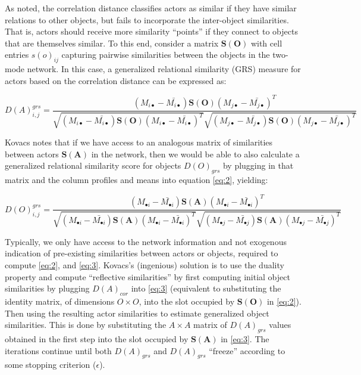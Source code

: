 \documentclass[a4paper,fleqn]{cas-sc}
\begin{document}
As noted, the correlation distance classifies actors as similar if they have similar relations to other objects, but fails to incorporate the inter-object similarities. That is, actors should receive more similarity ``points'' if they connect to objects that are themselves similar. To this end, consider a matrix $\mathbf{S(O)}$ with cell entries $s(o)_{ij}$ capturing pairwise similarities between the objects in the two-mode network. In this case, a generalized relational similarity (GRS) measure for actors based on the correlation distance can be expressed as:

\begin{equation}
    D(A)^{grs}_{i,j} = 
    \frac{
    (M_{i\bullet} - \bar{M_{i\bullet}})
    \mathbf{S(O)}
    (M_{j\bullet} - \bar{M_{j\bullet}})^T
    }
    {
    \sqrt{
    (M_{i\bullet} - \bar{M_{i\bullet}})
    \mathbf{S(O)}
    (M_{i\bullet} - \bar{M_{i\bullet}})^T
    }
    \sqrt{
    (M_{j\bullet} - \bar{M_{j\bullet}})
    \mathbf{S(O)}
    (M_{j\bullet} - \bar{M_{j\bullet}})^T
        }
    }
    \label{eq:2}
\end{equation}

Kovacs notes that if we have access to an analogous matrix of similarities between actors $\mathbf{S(A)}$ in the network, then we would be able to also calculate a generalized relational similarity score for objects $D(O)_{grs}$ by plugging in that matrix and the column profiles and means into equation \ref{eq:2}, yielding:

\begin{equation}
    D(O)^{grs}_{i,j} = 
    \frac{
    (M_{\bullet i} - \bar{M_{\bullet i}})
    \mathbf{S(A)}
    (M_{\bullet i} - \bar{M_{\bullet i}})^T
    }
    {
    \sqrt{
    (M_{\bullet i} - \bar{M_{\bullet i}})
    \mathbf{S(A)}
    (M_{\bullet i} - \bar{M_{\bullet i}})^T
    }
    \sqrt{
    (M_{\bullet j} - \bar{M_{\bullet j}})
    \mathbf{S(A)}
    (M_{\bullet j} - \bar{M_{\bullet j}})^T
        }
    }
    \label{eq:3}
\end{equation}

Typically, we only have access to the network information and not exogenous indication of pre-existing similarities between actors or objects, required to compute \ref{eq:2}, and \ref{eq:3}. Kovacs's (ingenious) solution is to use the duality property and compute ``reflective similarities'' by first computing initial object similarities by plugging $D(A)_{cor}$ into \ref{eq:3} (equivalent to substituting the identity matrix, of dimensions $O \times O$, into the slot occupied by $\mathbf{S(O)}$ in \ref{eq:2}). Then using the resulting actor similarities to estimate generalized object similarities. This is done by substituting the $A \times A$ matrix of $D(A)_{grs}$ values obtained in the first step into the slot occupied by $\mathbf{S(A)}$ in \ref{eq:3}. The iterations continue until both $D(A)_{grs}$ and $D(A)_{grs}$ ``freeze'' according to some stopping criterion ($\epsilon$). 
\end{document}
